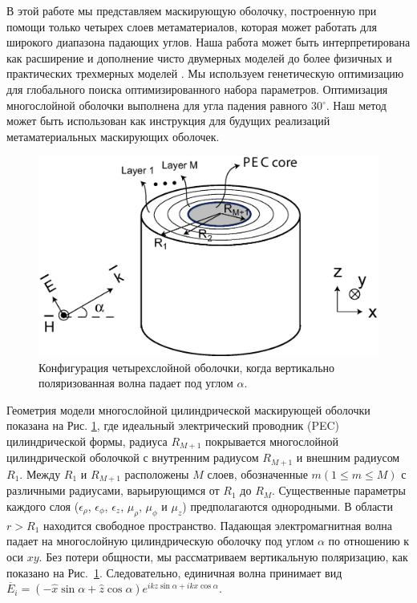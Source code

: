 \documentclass[a4paper, 12pt]{article}
\begin{document}
В этой работе мы представляем маскирующую оболочку, построенную при помощи 
только четырех слоев метаматериалов, которая может работать для широкого 
диапазона падающих углов. Наша работа может быть
интерпретирована как расширение и дополнение чисто двумерных моделей до более 
физичных и практических трехмерных моделей \cite{12, 13}. Мы используем 
генетическую оптимизацию для глобального поиска оптимизированного 
набора параметров. Оптимизация многослойной оболочки выполнена для угла 
падения равного 30$^{\circ}$. Наш метод может быть использован как инструкция 
для будущих реализаций метаматериальных маскирующих оболочек.

\begin{figure}
  \centering
  \includegraphics[width=0.5\columnwidth,draft=false]{Fig_1}
  \caption{
  Конфигурация четырехслойной оболочки, когда вертикально поляризованная волна падает под углом $\alpha$.
  }
  \label{fig:model}
\end{figure}

Геометрия модели многослойной цилиндрической маскирующей оболочки показана на 
Рис. \ref{fig:model}, где идеальный электрический проводник (PEC) 
цилиндрической формы, радиуса $R_{M+1}$ покрывается многослойной 
цилиндрической оболочкой с внутренним радиусом $R_{M+1}$ и 
внешним радиусом $R_1$. Между $R_1$ и $R_{M+1}$ расположены $M$ слоев, 
обозначенные $m (1 \le m \le M)$ с различными радиусами, варьирующимся от $R_1$
до $R_M$. Существенные параметры каждого слоя 
($\epsilon_\rho$, $\epsilon_\phi$, $\epsilon_z$, $\mu_\rho$, 
$\mu_\phi$ и $\mu_z$) предполагаются однородными. 
В области $r > R_1$ находится свободное пространство. Падающая 
электромагнитная волна падает на многослойную цилиндрическую оболочку под 
углом $\alpha$ по отношению к оси $xy$. Без потери общности, мы рассматриваем
вертикальную поляризацию, как показано на Рис.~\ref{fig:model}. Следовательно, 
единичная волна принимает вид 
$\overline{E}_i =(-\hat x\sin \alpha + \hat z \cos \alpha) 
e^{ikz \sin \alpha + ikx\cos \alpha}$.
\end{document}
